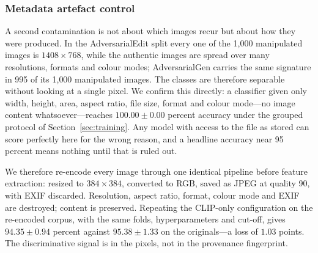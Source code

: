 %
%
%

\subsubsection{Metadata artefact control}
\label{sec:artefact}
A second contamination is not about which images recur but about how they were
produced. In the AdversarialEdit split every one of the 1{,}000 manipulated
images is $1408 \times 768$, while the authentic images are spread over many
resolutions, formats and colour modes; AdversarialGen carries the same
signature in 995 of its 1{,}000 manipulated images. The classes are therefore
separable without looking at a single pixel. We confirm this directly: a
classifier given only width, height, area, aspect ratio, file size, format and
colour mode---no image content whatsoever---reaches
$100.00 \pm 0.00$ percent accuracy under the grouped protocol of
Section~\ref{sec:training}. Any model with access to the file as stored can
score perfectly here for the wrong reason, and a headline accuracy near
95 percent means nothing until that is ruled out.

We therefore re-encode every image through one identical pipeline before
feature extraction: resized to $384 \times 384$, converted to RGB, saved as
JPEG at quality 90, with EXIF discarded. Resolution, aspect ratio, format,
colour mode and EXIF are destroyed; content is preserved. Repeating the
CLIP-only configuration on the re-encoded corpus, with the same folds,
hyperparameters and cut-off, gives $94.35 \pm 0.94$ percent against
$95.38 \pm 1.33$ on the originals---a loss of $1.03$ points. The discriminative
signal is in the pixels, not in the provenance fingerprint.

